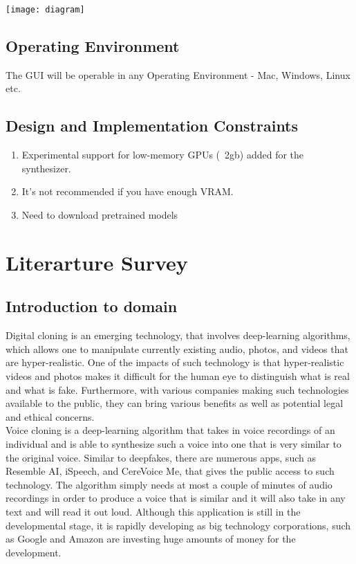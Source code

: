 \documentclass[12pt]{report}
\begin{document}
\texttt{[image: diagram]}

\section{Operating Environment}
The GUI will be operable in any Operating Environment - Mac, Windows, Linux etc.

\section{Design and Implementation Constraints}
\begin{enumerate}
\item{Experimental support for low-memory GPUs (~2gb) added for the synthesizer.}
\item{It's not recommended if you have enough VRAM.}
\item{Need to download pretrained models}
\end{enumerate}

\chapter{Literarture Survey}

\section{Introduction to domain}
Digital cloning is an emerging technology, that involves deep-learning algorithms, which allows one to manipulate currently existing audio, photos, and videos that are hyper-realistic. One of the impacts of such technology is that hyper-realistic videos and photos makes it difficult for the human eye to distinguish what is real and what is fake. Furthermore, with various companies making such technologies available to the public, they can bring various benefits as well as potential legal and ethical concerns.\\

Voice cloning is a deep-learning algorithm that takes in voice recordings of an individual and is able to synthesize such a voice into one that is very similar to the original voice. Similar to deepfakes, there are numerous apps, such as Resemble AI, iSpeech, and CereVoice Me, that gives the public access to such technology. The algorithm simply needs at most a couple of minutes of audio recordings in order to produce a voice that is similar and it will also take in any text and will read it out loud. Although this application is still in the developmental stage, it is rapidly developing as big technology corporations, such as Google and Amazon are investing huge amounts of money for the development.\\
\end{document}
